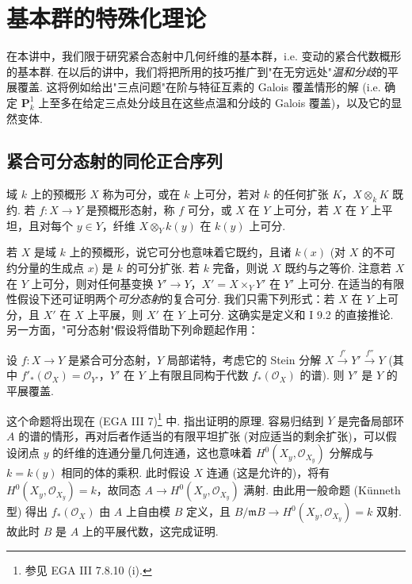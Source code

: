 \chapter{基本群的特殊化理论}

在本讲中，我们限于研究紧合态射中几何纤维的基本群，i.e. 变动的紧合代数概形的基本群. 在以后的讲中，我们将把所用的技巧推广到"在无穷远处"\emph{温和分歧}的平展覆盖. 这将例如给出"三点问题"在阶与特征互素的 Galois 覆盖情形的解 (i.e. 确定 $\mathbf{P}^1_k$ 上至多在给定三点处分歧且在这些点温和分歧的 Galois 覆盖)，以及它的显然变体.

\section{紧合可分态射的同伦正合序列}

\begin{definition}\label{def:X.1.1}
域 $k$ 上的预概形 $X$ 称为可分，或在 $k$ 上可分，若对 $k$ 的任何扩张 $K$，$X \otimes_k K$ 既约. 若 $f \colon X \to Y$ 是预概形态射，称 $f$ 可分，或 $X$ 在 $Y$ 上可分，若 $X$ 在 $Y$ 上平坦，且对每个 $y \in Y$，纤维 $X \otimes_Y k(y)$ 在 $k(y)$ 上可分.
\end{definition}

若 $X$ 是域 $k$ 上的预概形，说它可分也意味着它既约，且诸 $k(x)$ (对 $X$ 的不可约分量的生成点 $x$) 是 $k$ 的可分扩张. 若 $k$ 完备，则说 $X$ 既约与之等价. 注意若 $X$ 在 $Y$ 上可分，则对任何基变换 $Y' \to Y$，$X' = X \times_Y Y'$ 在 $Y'$ 上可分. 在适当的有限性假设下还可证明两个\emph{可分态射}的复合可分. 我们只需下列形式：若 $X$ 在 $Y$ 上可分，且 $X'$ 在 $X$ 上平展，则 $X'$ 在 $Y$ 上可分. 这确实是定义和 I 9.2 的直接推论. 另一方面，"可分态射"假设将借助下列命题起作用：

\begin{proposition}\label{prop:X.1.2}
设 $f \colon X \to Y$ 是紧合可分态射，$Y$ 局部诺特，考虑它的 Stein 分解 $X \xrightarrow{f'} Y' \xrightarrow{f''} Y$ (其中 $f'_*(\mathcal{O}_X) = \mathcal{O}_{Y'}$，$Y'$ 在 $Y$ 上有限且同构于代数 $f_*(\mathcal{O}_X)$ 的谱). 则 $Y'$ 是 $Y$ 的平展覆盖.
\end{proposition}

这个命题将出现在 (EGA III 7)\footnote{参见 EGA III 7.8.10 (i).} 中. 指出证明的原理. 容易归结到 $Y$ 是完备局部环 $A$ 的谱的情形，再对后者作适当的有限平坦扩张 (对应适当的剩余扩张)，可以假设闭点 $y$ 的纤维的连通分量几何连通，这也意味着 $H^0(X_y, \mathcal{O}_{X_y})$ 分解成与 $k = k(y)$ 相同的体的乘积. 此时假设 $X$ 连通 (这是允许的)，将有 $H^0(X_y, \mathcal{O}_{X_y}) = k$，故同态 $A \to H^0(X_y, \mathcal{O}_{X_y})$ 满射. 由此用一般命题 (Künneth 型) 得出 $f_*(\mathcal{O}_X)$ 由 $A$ 上自由模 $B$ 定义，且 $B/\mathfrak{m}B \to H^0(X_y, \mathcal{O}_{X_y}) = k$ 双射. 故此时 $B$ 是 $A$ 上的平展代数，这完成证明.

